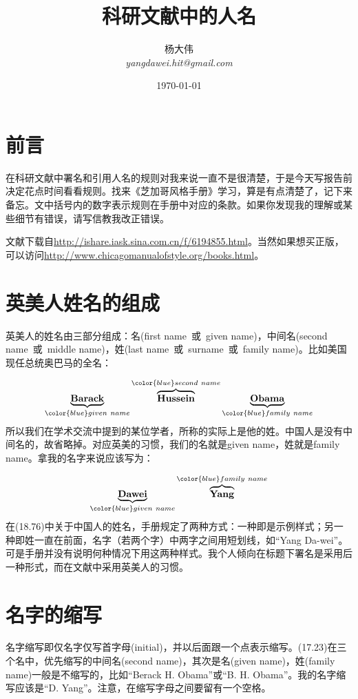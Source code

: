 \documentclass[UTF8,a4paper]{article}
\title{科研文献中的人名}
\author{杨大伟 \\ {\it yangdawei.hit@gmail.com}}
\date{\today}
\newcommand\mycite[1]{\raisebox{1.0ex}{\zihao{6}\cite{#1}}}
\begin{document}
\maketitle

\section{前言}
在科研文献中署名和引用人名的规则对我来说一直不是很清楚，于是今天写报告前决定花点时间看看规则。找来《芝加哥风格手册》\mycite{chicago}学习，算是有点清楚了，记下来备忘。文中括号内的数字表示规则在手册中对应的条款。如果你发现我的理解或某些细节有错误\Frowny，请写信教我改正错误\Smiley。

文献\cite{chicago}下载自\url{http://ishare.iask.sina.com.cn/f/6194855.html}。当然如果想买正版，可以访问\url{http://www.chicagomanualofstyle.org/books.html}。

\section{英美人姓名的组成}
英美人的姓名由三部分组成：名(first name\ 或\ given name)，中间名(second name\ 或\  middle name)，姓(last name\ 或\ surname\ 或\ family name)\mycite{name}\mycite{wiki}。比如美国现任总统奥巴马的全名：

\Pointinghand
\begin{equation*}
\underbrace{\bf Barack}_{\color{blue} given\ name} \overbrace{\bf Hussein}^{{\color{blue} second\ name}} \underbrace{\bf Obama}_{\color{blue} family\  name}
\end{equation*}
所以我们在学术交流中提到的某位学者，所称的实际上是他的姓。中国人是没有中间名的，故省略掉。对应英美的习惯，我们的名就是given name，姓就是family name。拿我的名字来说应该写为：

\Pointinghand
\begin{equation*}
\underbrace{\bf Dawei}_{\color{blue} given\ name} \overbrace{\bf Yang}^{{\color{blue} family\  name}}
\end{equation*}
在(18.76)中关于中国人的姓名，手册规定了两种方式：一种即是示例样式；另一种即姓一直在前面，名字（若两个字）中两字之间用短划线，如“Yang Da-wei”。可是手册并没有说明何种情况下用这两种样式。我个人倾向在标题下署名是采用后一种形式，而在文献中采用英美人的习惯。

\section{名字的缩写}
名字缩写即仅名字仅写首字母(initial)，并以后面跟一个点表示缩写。(17.23)在三个名中，优先缩写的中间名(second name)，其次是名(given name)，姓(family name)一般是不缩写的，比如“Berack H. Obama”或“B. H. Obama”。我的名字缩写应该是“D. Yang”。注意，在缩写字母之间要留有一个空格。
\end{document}
